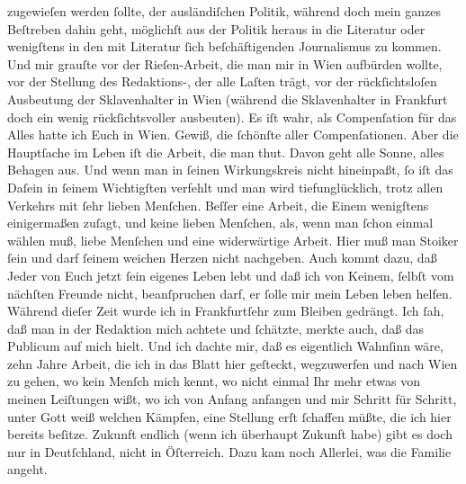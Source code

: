                zugewieſen werden{ }ſollte, der ausländiſchen Politik, während doch mein ganzes
               Beſtreben dahin geht, möglichſt aus der Politik heraus in die Literatur oder
               wenigſtens in den mit Literatur{ }ſich beſchäftigenden Journalismus zu kommen. Und mir
               grauſte vor der Rieſen-Arbeit, die man mir in Wien
               aufbürden wollte, vor der Stellung des Redaktions-\label{K_L02868-5v}\label{K_L02868-5}, der alle Laſten
               trägt, vor der rückſichtsloſen Ausbeutung der Sklavenhalter in Wien (während die Sklavenhalter in Frankfurt doch ein wenig  rückſichtsvoller ausbeuten). Es iſt wahr, als Compenſation für das Alles hatte
               ich Euch in Wien.  Gewiß, die{ }ſchönſte aller Compenſationen. Aber  die Hauptſache im Leben iſt die Arbeit, die man thut. Davon geht alle
               Sonne, alles Behagen aus. Und wenn man in{ }ſeinen Wirkungskreis nicht hineinpaßt,{ }ſo
               iſt das Daſein in{ }ſeinem Wichtigſten verfehlt und man wird tiefunglücklich, trotz
               allen Verkehrs {\pb}mit{ }ſehr lieben Menſchen. Beſſer
               eine Arbeit, die Einem wenigſtens einigermaßen zuſagt, und keine lieben Menſchen,
               als, wenn man{ }ſchon einmal wählen muß, liebe Menſchen und eine widerwärtige Arbeit.
                  \introOben{}Hier muß man Stoiker{ }ſein und darf{ }ſeinem weichen Herzen nicht
                  nachgeben.\introOben{} Auch kommt dazu, daß Jeder von Euch jetzt{ }ſein eigenes Leben lebt
               und daß ich von \strikeout{\textcolor{gray}{K}} Keinem,{ }ſelbſt vom nächſten Freunde nicht, beanſpruchen darf, er{ }ſolle mir
               mein Leben leben helfen. Während dieſer Zeit wurde ich in Frankfurtſehr zum Bleiben gedrängt. Ich{ }ſah, daß  man in der Redaktion mich achtete und{ }ſchätzte, merkte auch, daß das
               Publicum auf mich hielt. Und ich dachte mir, daß es eigentlich Wahnſinn wäre, zehn
               Jahre Arbeit, die ich in das Blatt hier geſteckt, wegzuwerfen\strikeout{,} und nach
                  Wien zu gehen, wo kein Menſch mich kennt, wo
               nicht einmal Ihr mehr etwas von meinen Leiſtungen wißt, wo ich von Anfang anfangen
                   und mir Schritt für Schritt, unter Gott weiß
               welchen Kämpfen, {\pb}eine Stellung erſt{ }ſchaffen müßte,
               die ich hier bereits beſitze. Zukunft endlich (wenn ich überhaupt Zukunft habe) gibt
               es doch nur in Deutſchland, nicht in Öſterreich. Dazu kam noch Allerlei, was die
               Familie angeht.\pend
           
